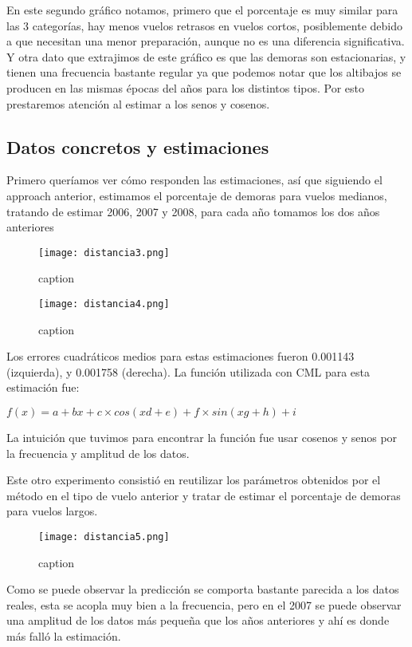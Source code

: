 En este segundo gráfico notamos, primero que el porcentaje es muy similar para las 3 categorías, hay menos vuelos retrasos en vuelos cortos, posiblemente debido a que necesitan una menor preparación, aunque no es una diferencia significativa. Y otra dato que extrajimos de este gráfico es que las demoras son estacionarias, y tienen una frecuencia bastante regular ya que podemos notar que los altibajos se producen en las mismas épocas del años para los distintos tipos. Por esto prestaremos atención al estimar a los senos y cosenos.


\subsection{Datos concretos y estimaciones}

Primero queríamos ver cómo responden las estimaciones, así que siguiendo el approach anterior, estimamos el porcentaje de demoras para vuelos medianos, tratando de estimar 2006, 2007 y 2008, para cada año tomamos los dos años anteriores

\begin{figure}[!htb]
\begin{center}
\texttt{[image: distancia3.png]}
\caption{caption}
\label{label}
\end{center}
\end{figure}

\begin{figure}[!htb]
\begin{center}
\texttt{[image: distancia4.png]}
\caption{caption}
\label{label}
\end{center}
\end{figure}

Los errores cuadráticos medios para estas estimaciones fueron 0.001143 (izquierda), y 0.001758 (derecha). La función utilizada con CML para esta estimación fue:

\bigskip

$f(x) = a + bx + c \times cos(xd + e) + f \times sin(xg + h) + i$

La intuición que tuvimos para encontrar la función fue usar cosenos y senos por la frecuencia y amplitud de los datos.

Este otro experimento consistió en reutilizar los parámetros obtenidos por el método en el tipo de vuelo anterior y tratar de estimar el porcentaje de demoras para vuelos largos.

\begin{figure}[!htb]
\begin{center}
\texttt{[image: distancia5.png]}
\caption{caption}
\label{label}
\end{center}
\end{figure}

Como se puede observar la predicción se comporta bastante parecida a los datos reales, esta se acopla muy bien a la frecuencia, pero en el 2007 se puede observar una amplitud de los datos más pequeña que los años anteriores y ahí es donde más falló la estimación.